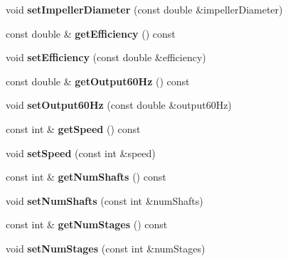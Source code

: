 \begin{DoxyCompactItemize}
\mbox{\label{class_pump_data_acf108c3f243f2657e890cb59fc8094e8}} 
void {\bfseries set\+Impeller\+Diameter} (const double \&impeller\+Diameter)
\item 
\mbox{\label{class_pump_data_a4f4cd38a397399668cf34aba3a06cd26}} 
const double \& {\bfseries get\+Efficiency} () const
\item 
\mbox{\label{class_pump_data_a283c8ef3bc5fb41bf1dac25cced2b9ca}} 
void {\bfseries set\+Efficiency} (const double \&efficiency)
\item 
\mbox{\label{class_pump_data_a19be6e6f7528b5af68dc3b5540b475e5}} 
const double \& {\bfseries get\+Output60\+Hz} () const
\item 
\mbox{\label{class_pump_data_adf044cb65988254afd886615ec246282}} 
void {\bfseries set\+Output60\+Hz} (const double \&output60\+Hz)
\item 
\mbox{\label{class_pump_data_a902d79e046f8e84f767f2cac1d552319}} 
const int \& {\bfseries get\+Speed} () const
\item 
\mbox{\label{class_pump_data_a0f77b3df49389366a69f64723bbabbd5}} 
void {\bfseries set\+Speed} (const int \&speed)
\item 
\mbox{\label{class_pump_data_abf6c112b5ac149ac69dcf9a89adcb1e5}} 
const int \& {\bfseries get\+Num\+Shafts} () const
\item 
\mbox{\label{class_pump_data_a878523749e12368d8327c4b240782a91}} 
void {\bfseries set\+Num\+Shafts} (const int \&num\+Shafts)
\item 
\mbox{\label{class_pump_data_a19fcd2d302e6b1d95101228334061739}} 
const int \& {\bfseries get\+Num\+Stages} () const
\item 
\mbox{\label{class_pump_data_a007fd13673a38cc97a64ae64f008b91e}} 
void {\bfseries set\+Num\+Stages} (const int \&num\+Stages)
\item 
\mbox{\label{class_pump_data_a9f3821daa6f4439adddb1f9b691af7de}} 

\end{DoxyCompactItemize}
